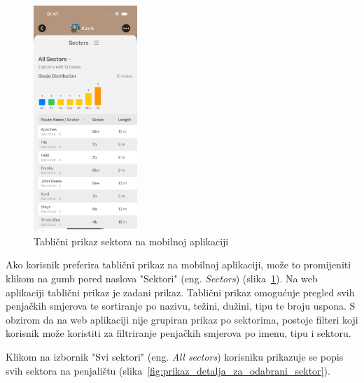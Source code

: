 \begin{figure}[H]
    \centering
    \includegraphics[width=0.35\textwidth]{images/implementacija/crag-details/crag-all-sectors-table.png}
    \caption{Tablični prikaz sektora na mobilnoj aplikaciji}
    \label{fig:tablični_prikaz_sektora}
\end{figure}

Ako korisnik preferira tablični prikaz na mobilnoj aplikaciji, može to promijeniti klikom na gumb pored naslova "Sektori" (eng. \textit{Sectors}) (slika~\ref{fig:tablični_prikaz_sektora}). Na web aplikaciji tablični prikaz je zadani prikaz. Tablični prikaz omogućuje pregled svih penjačkih smjerova te sortiranje po nazivu, težini, dužini, tipu te broju uspona. S obzirom da na web aplikaciji nije grupiran prikaz po sektorima, postoje filteri koji korisnik može koristiti za filtriranje penjačkih smjerova po imenu, tipu i sektoru.

Klikom na izbornik "Svi sektori" (eng. \textit{All sectors}) korisniku prikazuje se popis svih sektora na penjalištu (slika~\ref{fig:prikaz_detalja_za_odabrani_sektor}). 

